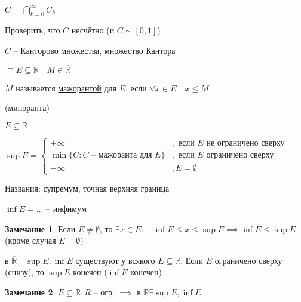 \documentclass{book}
\newcommand\R{\ensuremath{\mathbb{R}}}
\renewcommand\O{\ensuremath{\emptyset}}
\newcommand{\ov}[1]{\overline{#1}}
\theoremstyle{definition}
\newtheorem*{note}{Замечание}
\begin{document}
$C = \bigcap\limits_{k=0}^{\infty }C_k$

Проверить, что $C$ несчётно (и  $C\sim [0,1]$)

$C$ -- Канторово множества, множество Кантора

\begin{definition}
    $\sqsupset E\subseteq \R\quad M\in \ov{\R}$

    $M$ называется \underline{мажорантой} для  $E$, если  $\forall x\in E\quad x\leqslant M$

    (\underline{миноранта})
\end{definition}

\begin{definition}
	
    $E \subseteq \R$
    
    \hspace{-0.3cm}$\sup E = \begin{cases}
        +\infty &, \text{ если } E \text{ не ограничено сверху}\\
        \min\{C:C \text{ -- мажоранта для } E\}&, \text{ если } E \text{ ограничено сверху}\\
        -\infty &, E = \O 
    \end{cases}$

    Названия: супремум, точная верхняя граница

    $\inf E = \ldots$ -- инфимум
\end{definition}

\begin{note}
    Если $E\neq \O$, то $\exists x\in E:\quad \inf E\leqslant x\leqslant \sup E \implies \inf E\leqslant \sup E$ (кроме случая $E=\O $)
\end{note}

\begin{theorem}
    в $\ov{\R}\quad \sup E, \inf E$ существуют у всякого $E\subseteq \R$. Если $E$ ограничено сверху (снизу), то  $\sup E$ конечен ($\inf E$ конечен)
\end{theorem}

\begin{note}
    $E\subseteq \R, R$ -- огр. $\implies $ в $\R\exists \sup E, \inf E$
\end{note}
\end{document}
